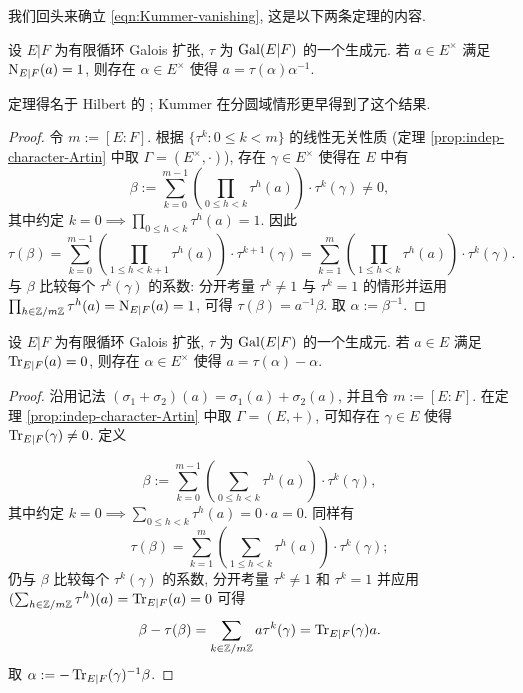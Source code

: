 我们回头来确立 \eqref{eqn:Kummer-vanishing}, 这是以下两条定理的内容.

\begin{theorem}\label{prop:Hilbert-90-multiplicative}
	设 $E|F$ 为有限循环 Galois 扩张, $\tau$ 为 $\operatorname{Gal}(E|F)$ 的一个生成元. 若 $a \in E^\times$ 满足 $\operatorname{N}_{E|F}(a)=1$, 则存在 $\alpha \in E^\times$ 使得 $a = \tau(\alpha)\alpha^{-1}$.
\end{theorem}
定理得名于 Hilbert 的 \cite[\S 54, Satz 90]{Hilb94}; Kummer 在分圆域情形更早得到了这个结果.
\begin{proof}
	令 $m := [E:F]$. 根据 $\{\tau^k : 0 \leq k < m \}$ 的线性无关性质 (定理 \ref{prop:indep-character-Artin} 中取 $\Gamma = (E^\times, \cdot)$), 存在 $\gamma \in E^\times$ 使得在 $E$ 中有
	\[ \beta := \sum_{k=0}^{m-1} \left( \prod_{0 \leq h < k} \tau^h(a) \right) \cdot \tau^k(\gamma) \neq 0, \]
	其中约定 $k=0 \implies \prod_{0 \leq h < k} \tau^h(a) = 1$. 因此
	\[ \tau(\beta) = \sum_{k=0}^{m-1} \left( \prod_{1 \leq h < k+1} \tau^h(a) \right) \cdot \tau^{k+1}(\gamma) = \sum_{k=1}^m \left( \prod_{1 \leq h < k} \tau^h(a) \right) \cdot \tau^k(\gamma). \]
	与 $\beta$ 比较每个 $\tau^k(\gamma)$ 的系数: 分开考量 $\tau^k \neq 1$ 与 $\tau^k=1$ 的情形并运用 $\prod_{h \in \mathbb{Z}/m\mathbb{Z}} \tau^h(a) = \operatorname{N}_{E|F}(a) = 1$, 可得  $\tau(\beta)=a^{-1}\beta$. 取 $\alpha := \beta^{-1}$.
\end{proof}

\begin{theorem}\label{prop:Hilbert-90-additive}
	设 $E|F$ 为有限循环 Galois 扩张, $\tau$ 为 $\operatorname{Gal}(E|F)$ 的一个生成元. 若 $a \in E$ 满足 $\operatorname{Tr}_{E|F}(a)=0$, 则存在 $\alpha \in E^\times$ 使得 $a = \tau(\alpha) - \alpha$.
\end{theorem}
\begin{proof}
	沿用记法 $(\sigma_1 +\sigma_2)(a) = \sigma_1(a) + \sigma_2(a)$, 并且令 $m := [E:F]$. 在定理 \ref{prop:indep-character-Artin} 中取 $\Gamma = (E, +)$, 可知存在 $\gamma \in E$ 使得 $\operatorname{Tr}_{E|F}(\gamma) \neq 0$. 定义

	\[ \beta := \sum_{k=0}^{m-1} \left( \sum_{0 \leq h < k} \tau^h(a) \right) \cdot \tau^k(\gamma), \]
	其中约定 $k=0 \implies \sum_{0 \leq h < k} \tau^h(a) = 0 \cdot a = 0$. 同样有
	\[ \tau(\beta) = \sum_{k=1}^m \left( \sum_{1 \leq h < k} \tau^h(a) \right) \cdot \tau^k(\gamma); \]
	仍与 $\beta$ 比较每个 $\tau^k(\gamma)$ 的系数, 分开考量 $\tau^k \neq 1$ 和 $\tau^k=1$ 并应用 $(\sum_{h \in \mathbb{Z}/m\mathbb{Z}} \tau^h)(a) = \operatorname{Tr}_{E|F}(a) = 0$ 可得
	\[ \beta - \tau(\beta) = \sum_{k \in \mathbb{Z}/m\mathbb{Z}} a \tau^k(\gamma) = \operatorname{Tr}_{E|F}(\gamma) a. \]
	取 $\alpha := -\operatorname{Tr}_{E|F}(\gamma)^{-1} \beta$.
\end{proof}

